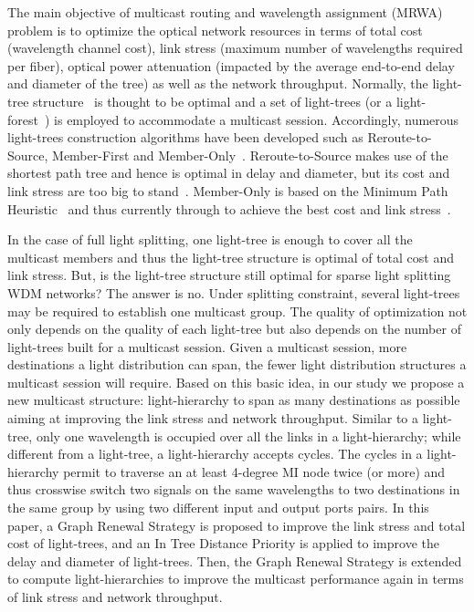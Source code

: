 \documentclass[conference]{IEEEtran}
\begin{document}
The main objective of multicast routing and wavelength assignment (MRWA)~\cite{aHamad2006} problem is to optimize the optical network resources in terms of total cost (wavelength channel cost), link stress (maximum number of wavelengths required per fiber), optical power attenuation (impacted by the average end-to-end delay and diameter of the tree) as well as the network throughput. Normally, the light-tree structure~\cite{lhSahasrabuddhe1999} is thought to be optimal and a set of light-trees (or a light-forest~\cite{xjzhang2000}) is employed to accommodate a multicast session. Accordingly, numerous light-trees construction algorithms have been developed such as Reroute-to-Source, Member-First and Member-Only~\cite{xjzhang2000}. Reroute-to-Source makes use of the shortest path tree and hence is optimal in delay and diameter, but its cost and link stress are too big to stand~\cite{fZhou2008Photonic}. Member-Only is based on the Minimum Path Heuristic~\cite{hTakahashi1980} and thus currently through to achieve the best cost and link stress~\cite{aHamad2006,fZhou2008Photonic,xjzhang2000}.

In the case of full light splitting, one light-tree is enough to cover all the multicast members and thus the light-tree structure is optimal of total cost and link stress. But, is the light-tree structure still optimal for sparse light splitting WDM networks? The answer is no. Under splitting constraint, several light-trees may be required to establish one multicast group. The quality of optimization not only depends on the quality of each light-tree but also depends on the number of light-trees built for a multicast session. Given a multicast session, more destinations a light distribution can span, the fewer light distribution structures a multicast session will require. Based on this basic idea, in our study we propose a new multicast structure: light-hierarchy to span as many destinations as possible aiming at improving the link stress and network throughput. Similar to a light-tree, only one wavelength is occupied over all the links in a light-hierarchy; while different from a light-tree, a light-hierarchy accepts cycles. The cycles in a light-hierarchy permit to traverse an at least 4-degree MI node twice (or more) and thus crosswise switch two signals on the same wavelengths to two destinations in the same group by using two different input and output ports pairs. In this paper, a Graph Renewal Strategy is proposed to improve the link stress and total cost of light-trees, and an In Tree Distance Priority is applied to improve the delay and diameter of light-trees. Then, the Graph Renewal Strategy is extended to compute light-hierarchies to improve the multicast performance again in terms of link stress and network throughput.
\end{document}
